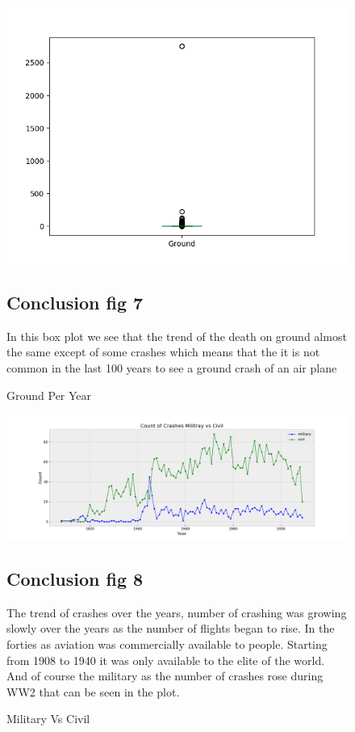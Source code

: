 \documentclass{article}
\begin{document}
\begin{figure}[!hbt]
\includegraphics[width=1.3\linewidth,height=0.500\textheight]{boxplot_ground.png}
\caption{Ground Per Year}
\label{fig7:}
\subsection{Conclusion fig 7}
In this box plot we see that the trend of the death on ground almost the same except of some crashes which means that the it is not common in the last 100 years to see a ground crash of an air plane 
\end{figure}

\begin{figure}[!hbt]
\includegraphics[width=1.3\linewidth,height=0.500\textheight]{MvsCivil.png}
\caption{Military Vs Civil}
\label{fig8:}
\subsection{Conclusion fig 8}
The trend of crashes over the years, number of crashing was growing slowly over the years as the number of flights began to rise. In the forties as aviation was commercially available to people. Starting from 1908 to 1940 it was only available to the elite of the world. And of course the military as the number of crashes rose during WW2 that can be seen in the plot.
\end{figure}
\end{document}
